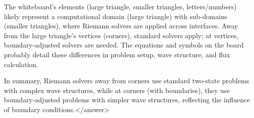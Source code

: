 The whiteboard’s elements (large triangle, smaller triangles, letters/numbers) likely represent a computational domain (large triangle) with sub-domains (smaller triangles), where Riemann solvers are applied across interfaces. Away from the large triangle’s vertices (corners), standard solvers apply; at vertices, boundary-adjusted solvers are needed. The equations and symbols on the board probably detail these differences in problem setup, wave structure, and flux calculation.  

In summary, Riemann solvers away from corners use standard two-state problems with complex wave structures, while at corners (with boundaries), they use boundary-adjusted problems with simpler wave structures, reflecting the influence of boundary conditions.</answer>